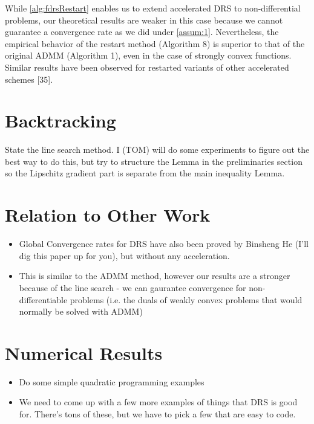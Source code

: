 \documentclass[11pt]{article}
\begin{document}
While \cref{alg:fdrsRestart} enables us to extend accelerated DRS to
non-differential problems, our theoretical results are weaker in this
case because we cannot guarantee a convergence rate as we did under
\cref{assum:1}. Nevertheless, the empirical behavior of the restart
method (Algorithm 8) is superior to that of the original ADMM
(Algorithm 1), even in the case of strongly convex functions. Similar
results have been observed for restarted variants of other accelerated
schemes [35].

\section{Backtracking}

State the line search method.  I (TOM) will do some experiments to
figure out the best way to do this, but try to structure the Lemma in
the preliminaries section so the Lipschitz gradient part is separate
from the main inequality Lemma.

\section{Relation to Other Work}
 \begin{itemize}
 \item Global Convergence rates for DRS have also been proved by Binsheng He (I'll dig this paper up for you), but without any acceleration.
 \item This is similar to the ADMM method, however our results are a stronger because of the line search - we can gaurantee convergence for non-differentiable problems (i.e. the duals of weakly convex problems that would normally be solved with ADMM)
 \end{itemize}

\section{Numerical Results}
 \begin{itemize}
 \item Do some simple quadratic programming examples
 \item We need to come up with a few more examples of things that DRS is good for.  There's tons of these, but we have to pick a few that are easy to code.
 \end{itemize}
\end{document}
